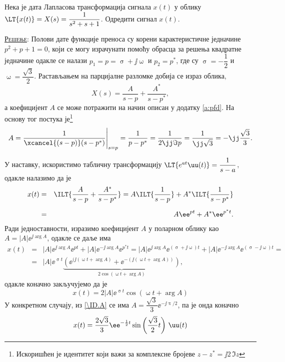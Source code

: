 \PID \label{z:damp_sin}
Нека је дата Лапласова трансформација сигнала $x(t)$ у облику $\LT{x(t)} = X(s) = \dfrac{1}{s^2 + s + 1}$. Одредити 
сигнал $x(t)$. 

\textsc{\underline{Решење}}: Полови дате функције преноса су корени карактеристичне једначине 
$p^2 + p + 1 = 0$, који се могу израчунати помоћу обрасца за решења квадратне једначине одакле се налази
$p_{1} = p = \upsigma + \jj\upomega$ и $p_2 = p^\ast$, где су $\upsigma = -\dfrac12$ и $ \upomega = \dfrac{\sqrt{3}}{2}$. 
Растављањем на парцијалне разломке добија се израз облика,
\begin{equation}
    X(s) = \dfrac{A}{s - p} + \dfrac{A^\ast}{s - p^\ast},
\end{equation}
а коефицијент $A$ се може потражити на начин описан у додатку \ref{a:pfd}. На основу тог постука 
је\footnote{Искоришћен је идентитет који важи за комплексне бројеве 
$z - z^\ast = \jj 2 \, \Im{z}$} 
\begin{equation}
    A = \dfrac{1}{\xcancel{(s - p)}(s - p^\ast)} \Bigg|_{s = p} 
      = \dfrac{1}{p - p^\ast} = \dfrac{1}{2 \jj \Im{p} } = \dfrac{1}{\jj\sqrt{3}} = -\jj \dfrac{\sqrt{3}}{3}. \label{\ID.A}
\end{equation}

У наставку, искористимо табличну трансформацију $\LT{e^{at}\uu(t)} = \dfrac{1}{s - a}$, одакле налазимо да је 
\begin{eqnarray}
x(t) &=& \ILT{ \dfrac{A}{s - p} + \dfrac{A^\ast}{s - p^\ast} } = 
       A \ILT{ \dfrac{1}{s - p}} + A^\ast \ILT{ \dfrac{1}{s - p^{\ast}}}  \\[2mm]
     &=&
     A \ee^{pt} + A^* \ee^{p^\ast t}.
\end{eqnarray}
Ради једноставности, изразимо коефицијент $A$ у поларном облику као $A = |A| \ee^{\jj\arg{A}}$, одакле се даље има
\begin{eqnarray}
    x(t) &=&
    |A| \ee^{\jj \arg{A}} \ee^{pt} + |A| \ee^{-\jj \arg{A}} \ee^{p^\ast t} = 
    |A| \ee^{\jj \arg{A}} \ee^{(\upsigma + \jj\upomega)t} + |A| \ee^{-\jj \arg{A}} \ee^{(\upsigma - \jj\upomega) t} = \\
    &=&
    |A| \ee^{\upsigma t} 
    \underbrace{
    \left( 
        \ee^{(\jj(\upomega t + \arg A) } + \ee^{ -(\jj(\upomega t + \arg A)) } 
    \right)}_{ 2\cos(\upomega t + \arg A) },
\end{eqnarray}
одакле коначно закључујемо да је 
\begin{equation}
    x(t) = 2|A| \ee^{\upsigma t} \cos(\upomega t + \arg A)
\end{equation}
У конкретном случају, из \eqref{\ID.A} се има $A = \dfrac{\sqrt 3}{3} \ee^{-\jj\uppi/2}$, па је онда коначно
\begin{equation}
    x(t) = \dfrac{2\sqrt 3}{3} \ee^{-\frac{1}{2}t} \sin \left(\dfrac{\sqrt 3}{2} t\right) \, \uu(t)
\end{equation}